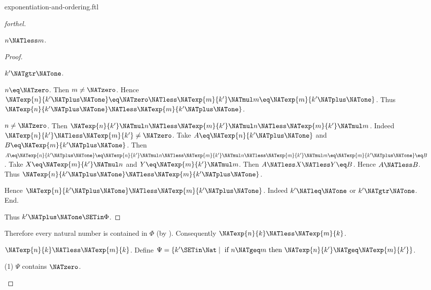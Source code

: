 \documentclass{naproche-library}
\begin{document}
\begin{smodule}[title=Exponentiation and Ordering]{exponentiation-and-ordering.ftl}
\begin{proof}[forthel]
\begin{case}{$n \NATless m$.}
\begin{proof}
        \begin{case}{$k' \NATgtr \NATone$.}
          \begin{case}{$n \eq \NATzero$.}
            Then $m \neq \NATzero$.
            Hence $\NATexp{n}{k' \NATplus \NATone}
              \eq \NATzero
              \NATless \NATexp{m}{k'} \NATmul m
              \eq \NATexp{m}{k' \NATplus \NATone}$.
            Thus $\NATexp{n}{k' \NATplus \NATone} \NATless \NATexp{m}{k' \NATplus \NATone}$.
          \end{case}

          \begin{case}{$n \neq \NATzero$.}
            Then $\NATexp{n}{k'} \NATmul n
              \NATless \NATexp{m}{k'} \NATmul n
              \NATless \NATexp{m}{k'} \NATmul m$.
            Indeed $\NATexp{n}{k'} \NATless \NATexp{m}{k'} \neq \NATzero$.
            Take $A \eq \NATexp{n}{k' \NATplus \NATone}$ and $B \eq \NATexp{m}{k' \NATplus \NATone}$. %
            Then $A
              \eq \NATexp{n}{k' \NATplus \NATone}
              \eq \NATexp{n}{k'} \NATmul n
              \NATless \NATexp{m}{k'} \NATmul n
              \NATless \NATexp{m}{k'} \NATmul m
              \eq \NATexp{m}{k' \NATplus \NATone}
              \eq B$.
            Take $X \eq \NATexp{m}{k'} \NATmul n$ and $Y \eq \NATexp{m}{k'} \NATmul m$.
            Then $A \NATless X \NATless Y \eq B$.
            Hence $A \NATless B$.
            Thus $\NATexp{n}{k' \NATplus \NATone} \NATless \NATexp{m}{k' \NATplus \NATone}$.
          \end{case}
        \end{case}

        Hence $\NATexp{n}{k' \NATplus \NATone} \NATless \NATexp{m}{k' \NATplus \NATone}$.
        Indeed $k' \NATleq \NATone$ or $k' \NATgtr \NATone$.
      End.

      Thus $k' \NATplus \NATone \SETin \Phi$.
    \end{proof}

    Therefore every natural number is contained in $\Phi$ (by ).
    Consequently $\NATexp{n}{k} \NATless \NATexp{m}{k}$.
  \end{case}

  \begin{case}{$\NATexp{n}{k} \NATless \NATexp{m}{k}$.}
    Define $\Psi = \{ k' \SETin \Nat \mid\text{ if }n \NATgeq m\text{ then }\NATexp{n}{k'} \NATgeq \NATexp{m}{k'} \}$.

    (1) $\Psi$ contains $\NATzero$.


\end{case}
\end{proof}
\end{smodule}
\end{document}
